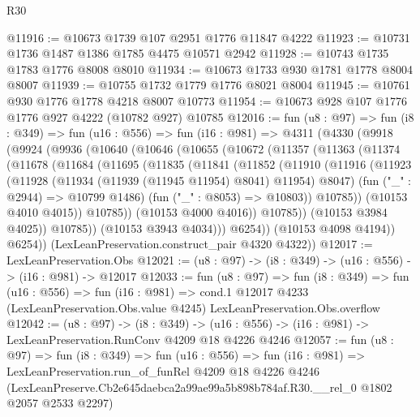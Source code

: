 \begin{lexlean}{R30}
\begin{coremodule}
@11916 := @10673 @1739 @107 @2951 @1776 @11847 @4222
@11923 := @10731 @1736 @1487 @1386 @1785 @4475 @10571 @2942
@11928 := @10743 @1735 @1783 @1776 @8008 @8010
@11934 := @10673 @1733 @930 @1781 @1778 @8004 @8007
@11939 := @10755 @1732 @1779 @1776 @8021 @8004
@11945 := @10761 @930 @1776 @1778 @4218 @8007 @10773
@11954 := @10673 @928 @107 @1776 @1776 @927 @4222 (@10782 @927) @10785
@12016 := fun (u8 : @97) =>
  fun (i8 : @349) =>
  fun (u16 : @556) =>
  fun (i16 : @981) =>
  @4311
    (@4330
      (@9918
        (@9924
          (@9936
            (@10640
              (@10646
                (@10655
                  (@10672
                    (@11357
                      (@11363
                        (@11374
                          (@11678
                            (@11684
                              (@11695
                                (@11835
                                  (@11841
                                    (@11852
                                      (@11910
                                        (@11916
                                          (@11923
                                            (@11928
                                              (@11934 (@11939 (@11945 @11954) @8041) @11954)
                                              @8047)
                                            (fun ("_" : @2944) => @10799 @1486)
                                            (fun ("_" : @8053) => @10803))
                                          @10785))
                                      (@10153 @4010 @4015))
                                    @10785))
                                (@10153 @4000 @4016))
                              @10785))
                          (@10153 @3984 @4025))
                        @10785))
                    (@10153 @3943 @4034)))
                @6254))
            (@10153 @4098 @4194))
          @6254))
      (LexLeanPreservation.construct_pair @4320 @4322))
@12017 := LexLeanPreservation.Obs
@12021 := (u8 : @97) -> (i8 : @349) -> (u16 : @556) -> (i16 : @981) -> @12017
@12033 := fun (u8 : @97) =>
  fun (i8 : @349) =>
  fun (u16 : @556) =>
  fun (i16 : @981) =>
  cond.{1} @12017 @4233 (LexLeanPreservation.Obs.value @4245) LexLeanPreservation.Obs.overflow
@12042 := (u8 : @97) ->
  (i8 : @349) -> (u16 : @556) -> (i16 : @981) -> LexLeanPreservation.RunConv @4209 @18 @4226 @4246
@12057 := fun (u8 : @97) =>
  fun (i8 : @349) =>
  fun (u16 : @556) =>
  fun (i16 : @981) =>
  LexLeanPreservation.run_of_funRel
    @4209
    @18
    @4226
    @4246
    (LexLeanPreserve.Cb2e645daebca2a99ae99a5b898b784af.R30.__rel_0 @1802 @2057 @2533 @2297)
\end{coremodule}
\end{lexlean}
